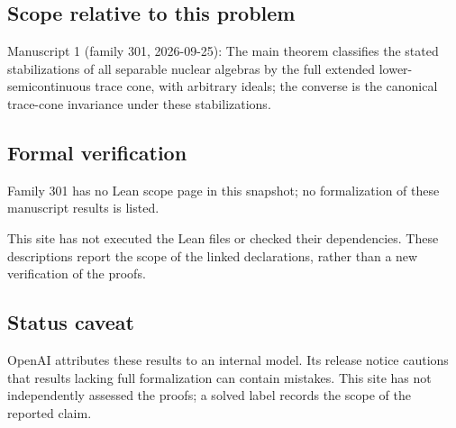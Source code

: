 \documentclass[11pt]{article}
\begin{document}
\subsection{Scope relative to this problem}
Manuscript 1 (family 301, 2026-09-25): The main theorem classifies the stated stabilizations of all separable nuclear algebras by the full extended lower-semicontinuous trace cone, with arbitrary ideals; the converse is the canonical trace-cone invariance under these stabilizations.

\subsection{Formal verification}
Family 301 has no Lean scope page in this snapshot; no formalization of these manuscript results is listed.

This site has not executed the Lean files or checked their dependencies. These descriptions report the scope of the linked declarations, rather than a new verification of the proofs.

\subsection{Status caveat}
OpenAI attributes these results to an internal model. Its release notice cautions that results lacking full formalization can contain mistakes. This site has not independently assessed the proofs; a solved label records the scope of the reported claim.
\end{document}
